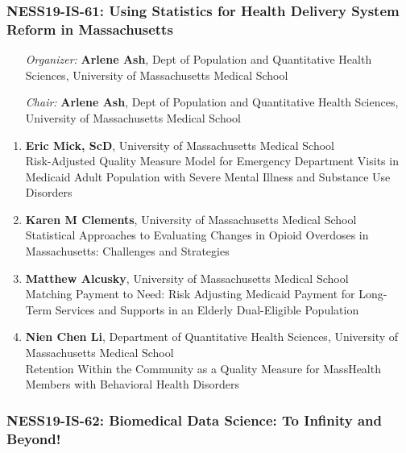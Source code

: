 \subsubsection*{NESS19-IS-61: Using Statistics for Health Delivery System Reform in Massachusetts}

\begin{enumerate}[align=left]
\item [\emph{Organizer:}] \textbf{Arlene Ash}, Dept of Population and Quantitative Health Sciences, University of Massachusetts Medical School \\
\item [\emph{Chair:}] \textbf{Arlene Ash}, Dept of Population and Quantitative Health Sciences, University of Massachusetts Medical School
\end{enumerate}

\begin{enumerate}
\item \textbf{Eric Mick, ScD}, University of Massachusetts Medical School \\
Risk-Adjusted Quality Measure Model for Emergency Department Visits in Medicaid Adult Population with Severe Mental Illness and Substance Use Disorders
\item \textbf{Karen M Clements}, University of Massachusetts Medical School \\
Statistical Approaches to Evaluating Changes in Opioid Overdoses in Massachusetts: Challenges and Strategies
\item \textbf{Matthew Alcusky}, University of Massachusetts Medical School \\
Matching Payment to Need: Risk Adjusting Medicaid Payment for Long-Term Services and Supports in an Elderly Dual-Eligible Population
\item \textbf{Nien Chen Li}, Department of Quantitative Health Sciences, University of Massachusetts Medical School \\
Retention Within the Community as a Quality Measure for MassHealth Members with Behavioral Health Disorders
\end{enumerate}

\subsubsection*{NESS19-IS-62: Biomedical Data Science: To Infinity and Beyond!}

